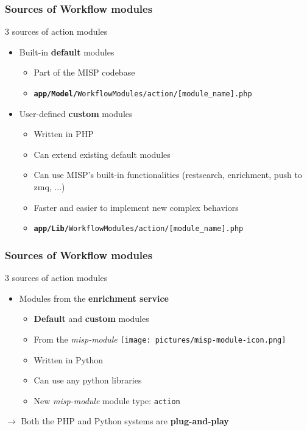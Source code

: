 \begin{frame}
    \frametitle{Sources of Workflow modules}
    3 sources of action modules
    \begin{itemize}
        \item Built-in \textbf{default} modules
        \begin{itemize}
            \item Part of the MISP codebase
            \item \texttt{\scriptsize \textbf{app/Model/}WorkflowModules/action/[module\_name].php}
        \end{itemize}
        \item User-defined \textbf{custom} modules
        \begin{itemize}
            \item Written in PHP
            \item Can extend existing default modules
            \item Can use MISP's built-in functionalities (restsearch, enrichment, push to zmq, ...)
            \item Faster and easier to implement new complex behaviors
            \item \texttt{\scriptsize \textbf{app/Lib/}WorkflowModules/action/[module\_name].php}
        \end{itemize}
    \end{itemize}
\end{frame}

\begin{frame}
    \frametitle{Sources of Workflow modules}
    3 sources of action modules
    \begin{itemize}
        \item Modules from the \textbf{enrichment service}
        \begin{itemize}
            \item \textbf{Default} and \textbf{custom} modules
            \item From the \textit{misp-module} \texttt{[image: pictures/misp-module-icon.png]}
            \item Written in Python
            \item Can use any python libraries
            \item New \textit{misp-module} module type: \texttt{action}
        \end{itemize}
    \end{itemize}
    \vspace{1em}
    \begin{center}
        $\rightarrow$ Both the PHP and Python systems are \textbf{plug-and-play}
    \end{center}
\end{frame}

